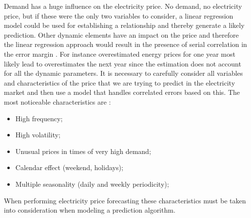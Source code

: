 Demand has a huge influence on the electricity price. No demand, no electricity price, but if these were the only two variables to consider, a linear regression model could be used for establishing a relationship and thereby generate a likely prediction. Other dynamic elements have an impact on the price and therefore the linear regression approach would result in the presence of serial correlation in the error margin \cite{21}. For instance overestimated energy prices for one year most likely lead to overestimates the next year since the estimation does not account for all the dynamic parameters. It is necessary to carefully consider all variables and characteristics of the price that we are trying to predict in the electricity market and then use a model that handles correlated errors based on this. The most noticeable characteristics are \cite{21}:
\begin{itemize}
\item High frequency;
\item High volatility;
\item Unusual prices in times of very high demand;
\item Calendar effect (weekend, holidays);
\item Multiple seasonality (daily and weekly periodicity);
\end{itemize}
When performing electricity price forecasting these characteristics must be taken into consideration when modeling a prediction algorithm. 

